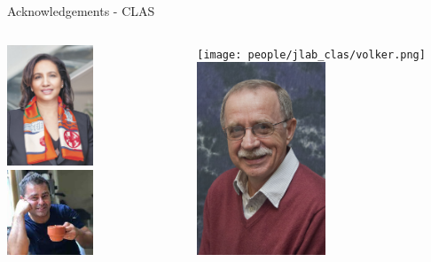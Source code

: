 \documentclass[aspectratio=169]{beamer}
\begin{document}
\begin{frame}{Acknowledgements - CLAS}
    \begin{columns}
        \centering
        \centering
            
            \includegraphics[width=0.5\textwidth]{people/jlab_clas/latifa.png}
            \includegraphics[width=0.5\textwidth]{people/jlab_clas/mauri.png}
            
        \centering
                
            \texttt{[image: people/jlab\_clas/volker.png]}
            \includegraphics[width=0.5\textwidth]{people/jlab_clas/valery.png}
        \centering
            

\end{columns}
\end{frame}
\end{document}
